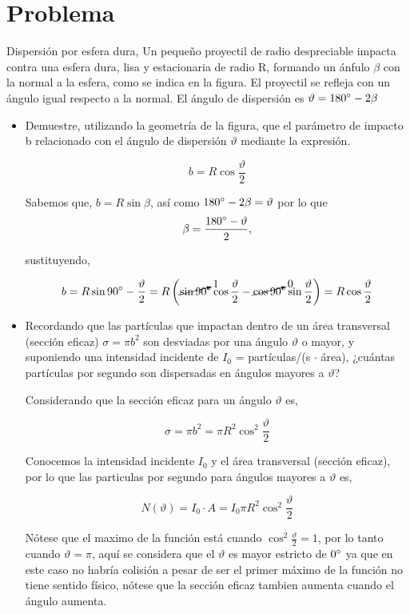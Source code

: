 \documentclass[12pt,a4paper]{article}
\begin{document}
\section*{Problema}

Dispersión por esfera dura, Un pequeño proyectil de radio despreciable impacta contra una esfera dura, lisa y estacionaria de radio R, formando un ánfulo $\beta$ con la normal a la esfera, como se indica en la figura. El proyectil se refleja con un ángulo igual respecto a la normal. El ángulo de dispersión es $\vartheta = 180\degree - 2\beta$

\begin{itemize}

\item Demuestre, utilizando la geometría de la figura, que el parámetro de impacto b relacionado con el ángulo de dispersión $\vartheta$ mediante la expresión.

$$
b = R\cos\frac{\vartheta}{2}
$$

Sabemos que, $b = R\sin \beta$, así como $180\degree - 2\beta = \vartheta$ por lo que \\

$$ \beta = \frac{180\degree - \vartheta}{2}, $$

sustituyendo, 

$$b = R\sin  90\degree - \frac{\vartheta}{2} = R \left( \cancelto{1}{\sin 90} \degree \cos \frac{\vartheta}{2} - \cancelto{0}{\cos 90} \degree \sin \frac{\vartheta}{2}\right) = R \cos \frac{\vartheta}{2}$$


\item Recordando que las partículas que impactan dentro de un área transversal (sección eficaz) $\sigma = \pi b^2$ son desviadas por una ángulo $\vartheta$ o mayor, y suponiendo una intensidad incidente de $I_0$ =  partículas/(s $\cdot$ área), ¿cuántas partículas por segundo son dispersadas en ángulos mayores a $\vartheta$?

Considerando que la sección eficaz para un ángulo $\vartheta$ es, 

$$\sigma = \pi b^2 = \pi R^2\cos^2\frac{\vartheta}{2}$$

Conocemos la intensidad incidente $I_0$ y el área transversal (sección eficaz), por lo que las particulas por segundo para ángulos mayores a $\vartheta$ es, 

$$N(\vartheta) = I_0 \cdot A =  I_0 \pi R^2\cos^2\frac{\vartheta}{2}$$

Nótese que el maximo de la función está cuando $\cos^2\frac{\vartheta}{2} = 1$, por lo tanto cuando $\vartheta = \pi$, aquí se considera que el $\vartheta$ es mayor estricto de $0\degree$ ya que en este caso no habría colisión a pesar de ser el primer máximo de la función no tiene sentido físico, nótese que la sección eficaz tambien aumenta cuando el ángulo aumenta.



\end{itemize}
\end{document}

